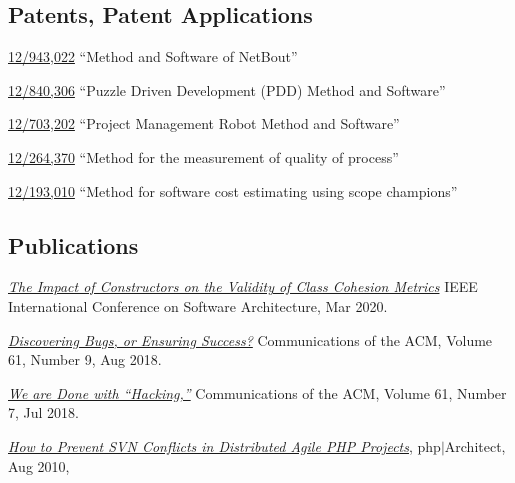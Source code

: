 \documentclass{yb}
\begin{document}
\subsection*{Patents, Patent Applications}

\href{https://patents.google.com/patent/US20120117164}{12/943,022}
``Method and Software of NetBout''

\href{https://patents.google.com/patent/US20120023476}{12/840,306}
``Puzzle Driven Development (PDD) Method and Software''

\href{https://patents.google.com/patent/US20110196798}{12/703,202}
``Project Management Robot Method and Software''

\href{https://patents.google.com/patent/US20100114638}{12/264,370}
``Method for the measurement of quality of process''

\href{https://patents.google.com/patent/US20100042968}{12/193,010}
``Method for software cost estimating using scope champions''

\subsection*{Publications}

\begin{samepage}
\emph{\href{https://www.yegor256.com/pdf/2020/icsa20.pdf}{The Impact of Constructors on the Validity of Class Cohesion Metrics}}\newline
IEEE International Conference on Software Architecture, Mar 2020.
\end{samepage}

\begin{samepage}
\emph{\href{https://www.yegor256.com/pdf/2018/discovering-bugs.pdf}{Discovering Bugs, or Ensuring Success?}}\newline
Communications of the ACM, Volume 61, Number 9, Aug 2018.
\end{samepage}

\begin{samepage}
\emph{\href{https://www.yegor256.com/pdf/2018/we-are-done-with-hacking.pdf}{We are Done with ``Hacking,''}}\newline
Communications of the ACM, Volume 61, Number 7, Jul 2018.
\end{samepage}

\begin{samepage}
\emph{\href{https://www.yegor256.com/pdf/2010/phpArchitect-conflicts.pdf}{How to Prevent SVN Conflicts in Distributed Agile PHP Projects}},\newline
php$|$Architect, Aug 2010,
\end{samepage}
\end{document}
